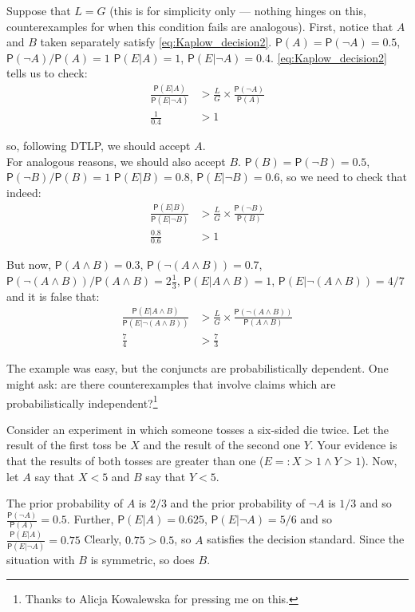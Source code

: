 \documentclass[10pt,dvipsnames,enabledeprecatedfontcommands]{scrartcl}
\newcommand{\n}{\neg}
\newcommand{\et}{\wedge}
\newcommand{\pr}[1]{\mathsf{P}(#1)}
\begin{document}
Suppose that \(L=G\) (this is for simplicity only --- nothing hinges on
this, counterexamples for when this condition fails are analogous).
First, notice that \(A\) and \(B\) taken separately satisfy
\eqref{eq:Kaplow_decision2}. \(\pr{A}=\pr{\n A}=0.5\),
\(\pr{\n A}/\pr{A}=1\) \(\pr{E\vert A}=1\), \(\pr{E\vert \n A}=0.4\).
\eqref{eq:Kaplow_decision2} tells us to check: \begin{align*}
 \frac{\pr{E\vert A}}{\pr{E\vert \n A}}&> \frac{L}{G}\times \frac{\pr{\n A}}{\pr{A}}\\
 \frac{1}{0.4} & > 1
 \end{align*}

\noindent so, following DTLP, we should accept \(A\).\\
For analogous reasons, we should also accept \(B\).
\(\pr{B}=\pr{\n B}=0.5\), \(\pr{\n B}/\pr{B}=1\) \(\pr{E\vert B}=0.8\),
\(\pr{E\vert \n B}=0.6\), so we need to check that indeed:
\begin{align*}
 \frac{\pr{E\vert B}}{\pr{E\vert \n B}}&> \frac{L}{G}\times \frac{\pr{\n B}}{\pr{B}}\\
 \frac{0.8}{0.6} & > 1 
 \end{align*}

But now, \(\pr{A\et B}=0.3\), \(\pr{\n (A \et B)}=0.7\),
\(\pr{\n (A\et B)}/\pr{A\et B}=2\frac{1}{3}\),
\(\pr{E\vert A \et B}=1\), \(\pr{E\vert \n (A\et B)}=4/7\) and it is
false that: \begin{align*}
 \frac{\pr{E\vert A \et B}}{\pr{E\vert \n (A\et B)}}&> \frac{L}{G}\times \frac{\pr{\n (A \et B)}}{\pr{A \et B}}\\
 \frac{7}{4} & > \frac{7}{3} 
 \end{align*}

The example was easy, but the conjuncts are probabilistically dependent.
One might ask: are there counterexamples that involve claims which are
probabilistically
independent?\footnote{Thanks to Alicja Kowalewska for pressing me on this.}

Consider an experiment in which someone tosses a six-sided die twice.
Let the result of the first toss be \(X\) and the result of the second
one \(Y\). Your evidence is that the results of both tosses are greater
than one (\(E=: X>1 \et Y>1\)). Now, let \(A\) say that \(X<5\) and
\(B\) say that \(Y<5\).

The prior probability of \(A\) is \(2/3\) and the prior probability of
\(\n A\) is \(1/3\) and so \(\frac{\pr{\n A}}{\pr{A}}=0.5\). Further,
\(\pr{E\vert A}=0.625\), \(\pr{E\vert \n A}= 5/6\) and so
\(\frac{\pr{E\vert A}}{\pr{E\vert \n A}}=0.75\) Clearly, \(0.75>0.5\),
so \(A\) satisfies the decision standard. Since the situation with \(B\)
is symmetric, so does \(B\).
\end{document}
